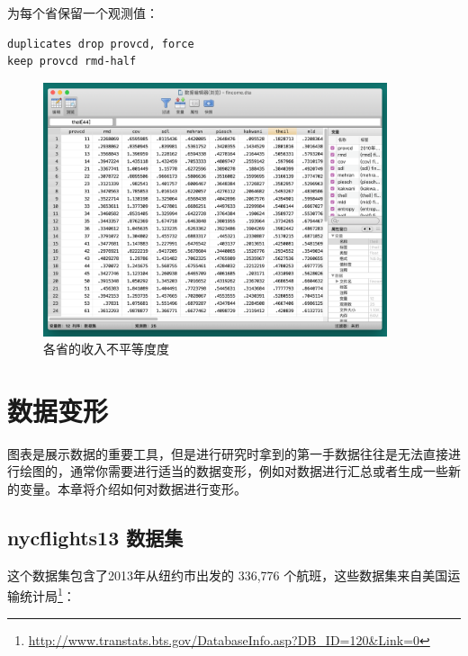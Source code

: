 \documentclass[]{ctexbook}
\renewcommand{\href}[2]{#2\footnote{\url{#1}}}
\begin{document}
为每个省保留一个观测值：

\begin{lstlisting}
duplicates drop provcd, force
keep provcd rmd-half
\end{lstlisting}

\begin{figure}

{\centering \includegraphics[width=0.9\textwidth]{assets/gini} 

}

\caption{各省的收入不平等度度}\label{fig:gini}
\end{figure}

\hypertarget{section-41}{%
\chapter{数据变形}\label{section-41}}

图表是展示数据的重要工具，但是进行研究时拿到的第一手数据往往是无法直接进行绘图的，通常你需要进行适当的数据变形，例如对数据进行汇总或者生成一些新的变量。本章将介绍如何对数据进行变形。

\hypertarget{nycflights13-}{%
\section{nycflights13 数据集}\label{nycflights13-}}

这个数据集包含了2013年从纽约市出发的 336,776 个航班，这些数据集来自美国\href{http://www.transtats.bts.gov/DatabaseInfo.asp?DB_ID=120\&Link=0}{运输统计局}：
\end{document}
